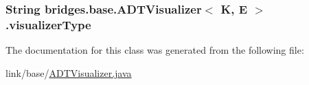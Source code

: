 \subsubsection[{visualizer\+Type}]{\setlength{\rightskip}{0pt plus 5cm}String {\bf bridges.\+base.\+A\+D\+T\+Visualizer}$<$ K, E $>$.visualizer\+Type}\label{classbridges_1_1base_1_1_a_d_t_visualizer_a288aece657b5641f48e839b34f3884b9}


The documentation for this class was generated from the following file\+:\begin{DoxyCompactItemize}
\item 
link/base/\hyperlink{_a_d_t_visualizer_8java}{A\+D\+T\+Visualizer.\+java}\end{DoxyCompactItemize}
